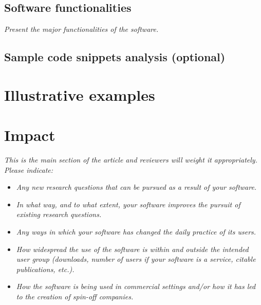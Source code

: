 \documentclass[preprint,12pt, a4paper]{elsarticle}
\begin{document}
\subsection{Software functionalities}
\textit{  Present the major functionalities of the software.}
  
 \subsection{Sample code snippets analysis (optional)}


\section{Illustrative examples}



\section{Impact}
\textit{This is the main section of the article and reviewers will weight it appropriately.
Please indicate:}
\begin{itemize}
    \item \textit{Any new research questions that can be pursued as a result of your software.}
    \item \textit{In what way, and to what extent, your software improves the pursuit of existing research questions.}
    \item \textit{Any ways in which your software has changed the daily practice of its users.}
    \item \textit{How widespread the use of the software is within and outside the intended user group (downloads, number of users if your software is a service, citable publications, etc.).}
    \item \textit{How the software is being used in commercial settings and/or how it has led to the creation of spin-off companies.}
    \end{itemize}
\end{document}

